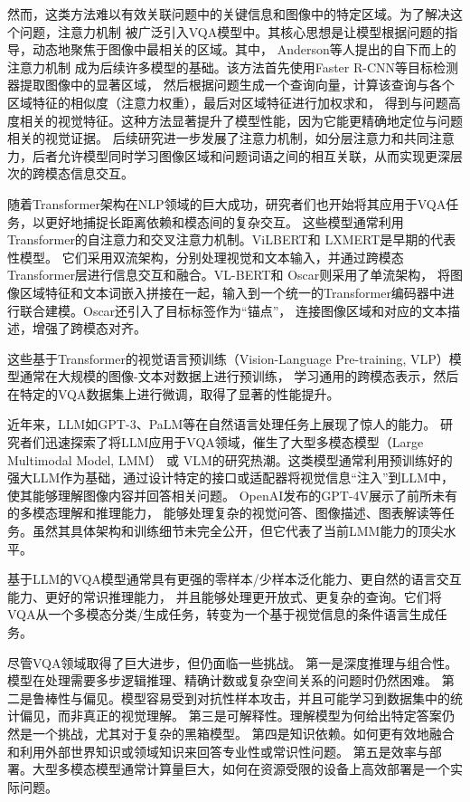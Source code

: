 然而，这类方法难以有效关联问题中的关键信息和图像中的特定区域。为了解决这个问题，注意力机制
被广泛引入VQA模型中。其核心思想是让模型根据问题的指导，动态地聚焦于图像中最相关的区域。其中， Anderson等人提出的自下而上的注意力机制\cite{anderson2018bottom}
成为后续许多模型的基础。该方法首先使用Faster R-CNN等目标检测器提取图像中的显著区域，
然后根据问题生成一个查询向量，计算该查询与各个区域特征的相似度（注意力权重），最后对区域特征进行加权求和，
得到与问题高度相关的视觉特征。这种方法显著提升了模型性能，因为它能更精确地定位与问题相关的视觉证据。
后续研究进一步发展了注意力机制，如分层注意力\cite{lu2016hierarchical}和共同注意力，后者允许模型同时学习图像区域和问题词语之间的相互关联，从而实现更深层次的跨模态信息交互。

随着Transformer架构在NLP领域的巨大成功，研究者们也开始将其应用于VQA任务，以更好地捕捉长距离依赖和模态间的复杂交互。
这些模型通常利用Transformer的自注意力和交叉注意力机制。ViLBERT\cite{lu2019vilbert}和 LXMERT\cite{tan2019lxmert}是早期的代表性模型。
它们采用双流架构，分别处理视觉和文本输入，并通过跨模态Transformer层进行信息交互和融合。VL-BERT\cite{su2019vl}和 Oscar\cite{li2020oscar}则采用了单流架构，
将图像区域特征和文本词嵌入拼接在一起，输入到一个统一的Transformer编码器中进行联合建模。Oscar还引入了目标标签作为“锚点”，
连接图像区域和对应的文本描述，增强了跨模态对齐。

这些基于Transformer的视觉语言预训练（Vision-Language Pre-training, VLP）模型通常在大规模的图像-文本对数据上进行预训练，
学习通用的跨模态表示，然后在特定的VQA数据集上进行微调，取得了显著的性能提升。

近年来，LLM如GPT-3、PaLM等在自然语言处理任务上展现了惊人的能力。
研究者们迅速探索了将LLM应用于VQA领域，催生了大型多模态模型（Large Multimodal Model, LMM） 或 
VLM的研究热潮。这类模型通常利用预训练好的强大LLM作为基础，通过设计特定的接口或适配器将视觉信息“注入”到LLM中，使其能够理解图像内容并回答相关问题。
OpenAI发布的GPT-4V\cite{openai2023gpt4v}展示了前所未有的多模态理解和推理能力，
能够处理复杂的视觉问答、图像描述、图表解读等任务。虽然其具体架构和训练细节未完全公开，但它代表了当前LMM能力的顶尖水平。

基于LLM的VQA模型通常具有更强的零样本/少样本泛化能力、更自然的语言交互能力、更好的常识推理能力，
并且能够处理更开放式、更复杂的查询。它们将VQA从一个多模态分类/生成任务，转变为一个基于视觉信息的条件语言生成任务。

尽管VQA领域取得了巨大进步，但仍面临一些挑战。
第一是深度推理与组合性。模型在处理需要多步逻辑推理、精确计数或复杂空间关系的问题时仍然困难。
第二是鲁棒性与偏见。模型容易受到对抗性样本攻击，并且可能学习到数据集中的统计偏见，而非真正的视觉理解。
第三是可解释性。理解模型为何给出特定答案仍然是一个挑战，尤其对于复杂的黑箱模型。
第四是知识依赖。如何更有效地融合和利用外部世界知识或领域知识来回答专业性或常识性问题。
第五是效率与部署。大型多模态模型通常计算量巨大，如何在资源受限的设备上高效部署是一个实际问题。
